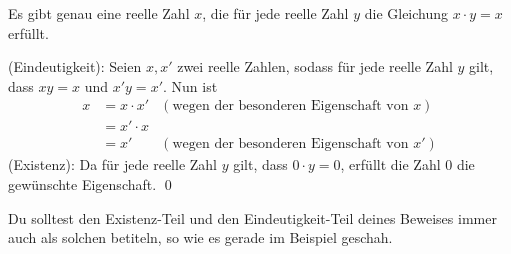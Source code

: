 \begin{bsp}
Es gibt genau eine reelle Zahl $x$, die für jede reelle Zahl $y$ die Gleichung $x\cdot y=x$ erfüllt.
\end{bsp}
\begin{bew}
 (Eindeutigkeit): Seien $x,x'$ zwei reelle Zahlen, sodass für jede reelle Zahl $y$ gilt, dass $xy=x$ und $x'y=x'$. Nun ist
 \begin{align*}
  x & = x\cdot x' & (\text{wegen der besonderen Eigenschaft von $x$}) \\
  & = x' \cdot x  \\
  & = x' & (\text{wegen der besonderen Eigenschaft von $x'$})
 \end{align*}
(Existenz): Da für jede reelle Zahl $y$ gilt, dass $0\cdot y=0$, erfüllt die Zahl $0$ die gewünschte Eigenschaft. \qed
\end{bew}

\begin{bem}[Signalwörter]
 Du solltest den Existenz-Teil und den Eindeutigkeit-Teil deines Beweises immer auch als solchen betiteln, so wie es gerade im Beispiel geschah.
\end{bem}





